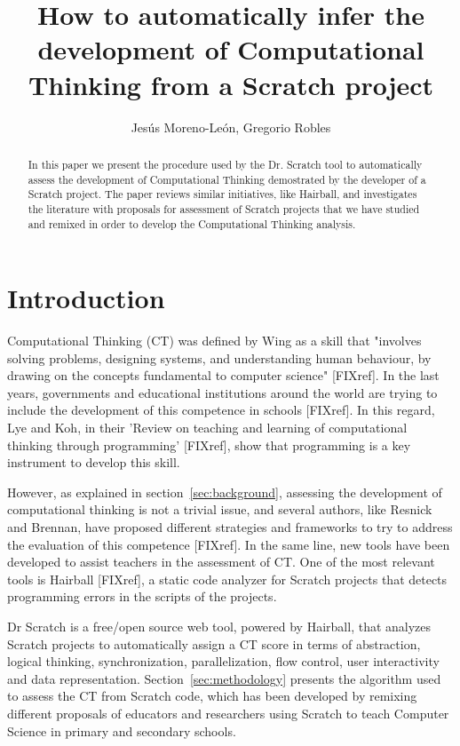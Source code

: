 \documentclass[a4paper,11pt]{article}
\title{How to automatically infer the development of Computational Thinking from a Scratch project}
\author{Jesús Moreno-León, Gregorio Robles}
\begin{document}
\maketitle

\begin{abstract}
In this paper we present the procedure used by the Dr. Scratch tool to automatically assess the development of Computational Thinking  demostrated by the developer of a Scratch project. The paper reviews similar initiatives, like Hairball, and investigates the literature with proposals for assessment of Scratch projects that we have studied and remixed in order to develop the Computational Thinking analysis.

\end{abstract}

\section{Introduction}
Computational Thinking (CT) was defined by Wing as a skill that "involves solving problems, designing systems, and understanding human behaviour, by drawing on the concepts fundamental to computer science" [FIXref]. In the last years, governments and educational institutions around the world are trying to include the development of this competence in schools [FIXref]. In this regard, Lye and Koh, in their 'Review on teaching and learning of computational thinking through programming' [FIXref], show that programming is a key instrument to develop this skill.

However, as explained in section~\ref{sec:background}, assessing the development of computational thinking is not a trivial issue, and several authors, like Resnick and Brennan, have proposed different strategies and frameworks to try to address the evaluation of this competence [FIXref]. In the same line, new tools have been developed to assist teachers in the assessment of CT. One of the most relevant tools is Hairball [FIXref], a static code analyzer for Scratch projects that detects programming errors in the scripts of the projects.

Dr Scratch is a free/open source web tool, powered by Hairball, that analyzes Scratch projects to automatically assign a CT score in terms of abstraction, logical thinking, synchronization, parallelization, flow control, user interactivity and data representation. Section~\ref{sec:methodology} presents the algorithm used to assess the CT from Scratch code, which has been developed by remixing different proposals of educators and researchers using Scratch to teach Computer Science in primary and secondary schools.
\end{document}
